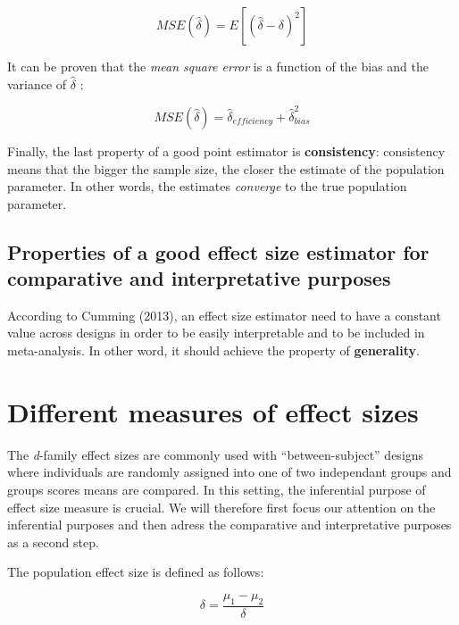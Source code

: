 \documentclass[man]{apa6}
\begin{document}
\begin{equation} 
MSE(\hat{\delta})=E[(\hat{\delta}-\delta)^2]
\label{eq:MSE1}
\end{equation}

It can be proven that the \emph{mean square error} is a function of the bias and the variance of \(\hat{\delta}\) :

\begin{equation} 
MSE(\hat{\delta})=\hat{\delta}_{efficiency}+\hat{\delta}_{bias}^2
\label{eq:MSE2}
\end{equation}

Finally, the last property of a good point estimator is \textbf{consistency}: consistency means that the bigger the sample size, the closer the estimate of the population parameter. In other words, the estimates \emph{converge} to the true population parameter.

\hypertarget{properties-of-a-good-effect-size-estimator-for-comparative-and-interpretative-purposes}{%
\subsection{Properties of a good effect size estimator for comparative and interpretative purposes}\label{properties-of-a-good-effect-size-estimator-for-comparative-and-interpretative-purposes}}

According to Cumming (2013), an effect size estimator need to have a constant value across designs in order to be easily interpretable and to be included in meta-analysis. In other word, it should achieve the property of \textbf{generality}.

\hypertarget{different-measures-of-effect-sizes}{%
\section{Different measures of effect sizes}\label{different-measures-of-effect-sizes}}

The \emph{d}-family effect sizes are commonly used with \enquote{between-subject} designs where individuals are randomly assigned into one of two independant groups and groups scores means are compared. In this setting, the inferential purpose of effect size measure is crucial. We will therefore first focus our attention on the inferential purposes and then adress the comparative and interpretative purposes as a second step.

The population effect size is defined as follows:

\begin{equation} 
\delta = \frac{\mu_{1}-\mu_{2}}{\delta} 
\label{eq:Cohendelta}
\end{equation}
\end{document}
